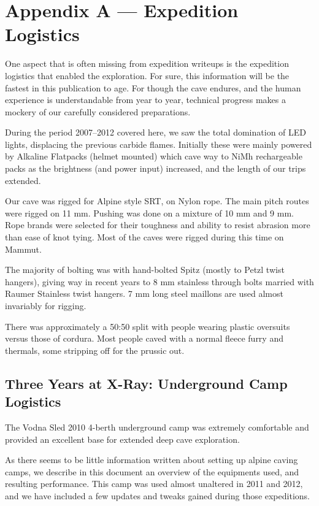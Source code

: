 \chapter{Appendix A --- Expedition
Logistics}

One aspect that is often missing from expedition writeups is the
expedition logistics that enabled the exploration. For sure, this
information will be the fastest in this publication to age. For though
the cave endures, and the human experience is understandable from year
to year, technical progress makes a mockery of our carefully considered
preparations.

During the period 2007--2012 covered here, we saw the total domination
of LED lights, displacing the previous carbide flames. Initially these
were mainly powered by Alkaline Flatpacks (helmet mounted) which cave
way to NiMh rechargeable packs as the brightness (and power input)
increased, and the length of our trips extended.

Our cave was rigged for Alpine style SRT, on Nylon rope. The main pitch
routes were rigged on 11 mm. Pushing was done on a mixture of 10 mm and
9 mm. Rope brands were selected for their toughness and ability to
resist abrasion more than ease of knot tying. Most of the caves were
rigged during this time on Mammut.

The majority of bolting was with hand-bolted Spitz (mostly to Petzl
twist hangers), giving way in recent years to 8 mm stainless through
bolts married with Raumer Stainless twist hangers. 7 mm long steel
maillons are used almost invariably for rigging.

There was approximately a 50:50 split with people wearing plastic
oversuits versus those of cordura. Most people caved with a normal
fleece furry and thermals, some stripping off for the prussic out.



\section{Three Years at X-Ray: Underground Camp
Logistics}

The Vodna Sled 2010 4-berth underground camp was extremely comfortable
and provided an excellent base for extended deep cave exploration.

As there seems to be little information written about setting up alpine
caving camps, we describe in this document an overview of the equipments
used, and resulting performance. This camp was used almost unaltered in
2011 and 2012, and we have included a few updates and tweaks gained
during those expeditions.


